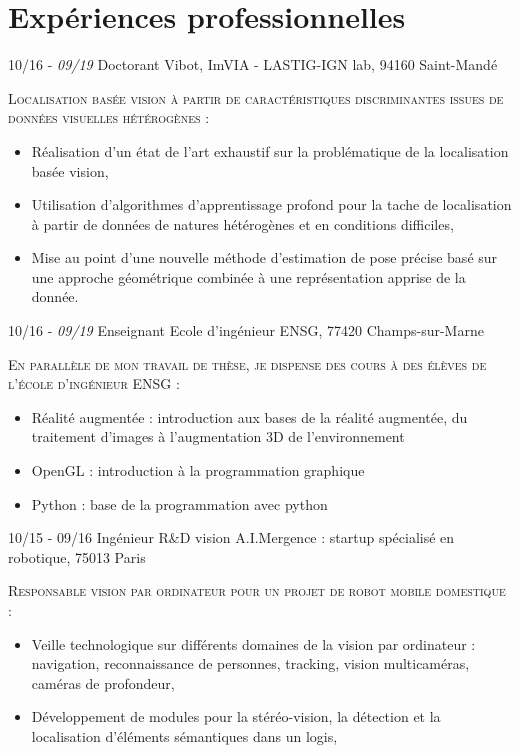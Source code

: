 \documentclass[]{friggeri-cv-cust}
\begin{document}
\section{Expériences professionnelles}
\begin{entrylist}
  \entry
    {\small{10/16 - \textit{09/19}}}
    {Doctorant}
    {Vibot, ImVIA - LASTIG-IGN lab, 94160 Saint-Mandé}
    {\textsc{Localisation basée vision à partir de caractéristiques discriminantes issues de données visuelles hétérogènes :}
    \begin{itemize}[label=$\rhd$]
    	\item Réalisation d'un état de l'art exhaustif sur la problématique de la localisation basée vision,
        \item Utilisation d’algorithmes d'apprentissage profond pour la tache de localisation à partir de données de natures hétérogènes et en conditions difficiles,
        \item Mise au point d'une nouvelle méthode d'estimation de pose précise basé sur une approche géométrique combinée à une représentation apprise de la donnée.
    \end{itemize}
    }
  \entry
    {\small{10/16 - \textit{09/19}}}
    {Enseignant}
    {Ecole d'ingénieur ENSG, 77420 Champs-sur-Marne}
    {\textsc{En parallèle de mon travail de thèse, je dispense des cours à des élèves de l'école d’ingénieur ENSG :}
    \begin{itemize}[label=$\rhd$]
        \item Réalité augmentée : introduction aux bases de la réalité augmentée, du traitement d'images à l'augmentation 3D de l'environnement
        \item OpenGL : introduction à la programmation graphique
   		\item Python : base de la programmation avec python
    \end{itemize}
    }
  \entry
    {10/15 - 09/16}
    {Ingénieur R\&D vision}
    {A.I.Mergence : startup spécialisé en robotique, 75013 Paris}
    {\textsc{Responsable vision par ordinateur pour un projet de robot mobile domestique :}
    \begin{itemize}[label=$\rhd$]
    	\item Veille technologique sur différents domaines de la vision par ordinateur : navigation, reconnaissance de personnes, tracking, vision multicaméras, caméras de profondeur,
    	\item Développement de modules pour la stéréo-vision, la détection et la localisation d'éléments sémantiques dans un logis,

\end{itemize}}
\end{entrylist}
\end{document}
